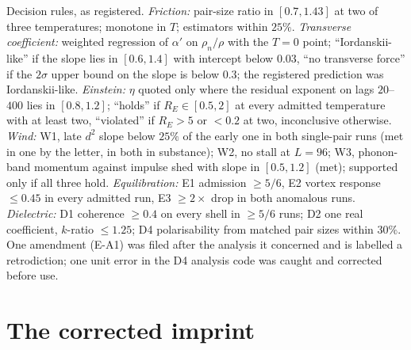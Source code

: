 \documentclass[11pt,a4paper]{article}
\begin{document}
Decision rules, as registered. \emph{Friction:} pair-size ratio in $[0.7,1.43]$ at two of three temperatures;
monotone in $T$; estimators within $25\%$. \emph{Transverse coefficient:} weighted regression of $\alpha'$ on
$\rho_n/\rho$ with the $T=0$ point; ``Iordanskii-like'' if the slope lies in $[0.6,1.4]$ with intercept below $0.03$,
``no transverse force'' if the $2\sigma$ upper bound on the slope is below $0.3$; the registered prediction was
Iordanskii-like. \emph{Einstein:} $\eta$ quoted only where the residual exponent on lags $20$--$400$ lies in $[0.8,1.2]$;
``holds'' if $R_E\in[0.5,2]$ at every admitted temperature with at least two, ``violated'' if $R_E>5$ or $<0.2$ at two,
inconclusive otherwise. \emph{Wind:} W1, late $d^2$ slope below $25\%$ of the early one in both single-pair runs
(met in one by the letter, in both in substance); W2, no stall at $L=96$; W3, phonon-band momentum against impulse
shed with slope in $[0.5,1.2]$ (met); supported only if all three hold. \emph{Equilibration:} E1 admission $\ge5/6$, E2
vortex response $\le0.45$ in every admitted run, E3 $\ge2\times$ drop in both anomalous runs. \emph{Dielectric:} D1
coherence $\ge0.4$ on every shell in $\ge5/6$ runs; D2 one real coefficient, $k$-ratio $\le1.25$; D4 polarisability
from matched pair sizes within $30\%$. One amendment (E-A1) was filed after the analysis it concerned and is labelled
a retrodiction; one unit error in the D4 analysis code was caught and corrected before use.

\section{The corrected imprint}\label{app:imprint}
\end{document}
